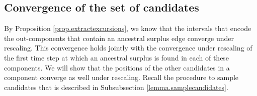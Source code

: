 
\subsection{Convergence of the set of candidates}
By Proposition \ref{prop.extractexcursions}, we know that the intervals that encode the out-components that contain an ancestral surplus edge converge under rescaling. This convergence holds jointly with the convergence under rescaling of the first time step at which an ancestral surplus is found in each of these components. We will show that the positions of the other candidates in a component converge as well under rescaling. Recall the procedure to sample candidates that is described in Subsubsection \ref{lemma.samplecandidates}. 


